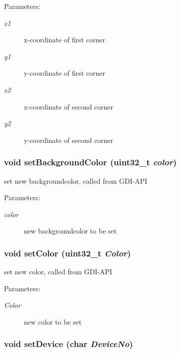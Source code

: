 \begin{Desc}
\item[Parameters:]
\begin{description}
\item[{\em x1}]x-coordinate of first corner \item[{\em y1}]y-coordinate of first corner \item[{\em x2}]x-coordinate of second corner \item[{\em y2}]y-coordinate of second corner \end{description}
\end{Desc}
\hypertarget{group__graphic__device_gc8bf090a80d7fe12147b6d87fd1ee83b}{
\subsubsection[{setBackgroundColor}]{\setlength{\rightskip}{0pt plus 5cm}void setBackgroundColor (uint32\_\-t {\em color})}}
\label{group__graphic__device_gc8bf090a80d7fe12147b6d87fd1ee83b}


set new backgroundcolor, called from GDI-API 

\begin{Desc}
\item[Parameters:]
\begin{description}
\item[{\em color}]new backgroundcolor to be set \end{description}
\end{Desc}
\hypertarget{group__graphic__device_ga22a0dd9dcea4d5c82fae9be9bf089f0}{
\subsubsection[{setColor}]{\setlength{\rightskip}{0pt plus 5cm}void setColor (uint32\_\-t {\em Color})}}
\label{group__graphic__device_ga22a0dd9dcea4d5c82fae9be9bf089f0}


set new color, called from GDI-API 

\begin{Desc}
\item[Parameters:]
\begin{description}
\item[{\em Color}]new color to be set \end{description}
\end{Desc}
\hypertarget{group__graphic__device_gb1d5625d6d64546097d27be58b43a5f9}{
\subsubsection[{setDevice}]{\setlength{\rightskip}{0pt plus 5cm}void setDevice (char {\em DeviceNo})}}
\label{group__graphic__device_gb1d5625d6d64546097d27be58b43a5f9}


